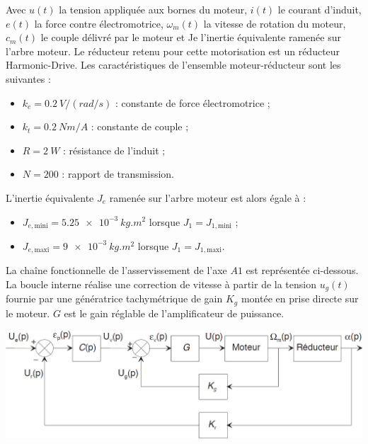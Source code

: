 \documentclass[10pt,fleqn]{article} %
\begin{document}
\begin{multicols}{2}
Avec  $u(t)$  la  tension  appliquée  aux  bornes  du moteur,  $i(t)$  le  courant  d’induit,  $e(t)$  la  force 
contre  électromotrice, $\omega_m(t)$  la  vitesse  de  rotation  du moteur,  $c_m(t)$  le  couple  délivré  par  le 
moteur et Je l’inertie équivalente ramenée sur l’arbre moteur. 
Le  réducteur  retenu  pour  cette  motorisation  est  un  réducteur  Harmonic-Drive.  Les 
caractéristiques de l’ensemble moteur-réducteur sont les suivantes : 
\begin{itemize}
\item $k_e = \SI{0,2}{V/(rad/s)}$ : constante de force électromotrice ; 
\item $k_t = \SI{0,2}{Nm/A}$ : constante de couple ; 
\item $R = \SI{2}{W}$ : résistance de l’induit ; 
\item $N = 200$ : rapport de transmission.
\end{itemize} 

L’inertie équivalente $J_e$ ramenée sur l’arbre moteur est alors égale à : 
\begin{itemize}
\item $J_{e,\text{mini}} = \SI{5,25e-3}{kg.m^2}$ lorsque $J_1=J_{1,\text{mini}}$ ; 
\item $J_{e,\text{maxi}} =\SI{9e-3}{kg.m^2}$ lorsque $J_1=J_{1,\text{maxi}}$.
\end{itemize}

La chaîne fonctionnelle de l’asservissement de l’axe $A1$ est représentée ci-dessous. La boucle interne réalise une correction de vitesse à partir de la tension $u_g(t)$ fournie par une 
génératrice  tachymétrique  de  gain $K_g$ montée  en  prise  directe  sur  le moteur. $G$  est  le  gain 
réglable de l’amplificateur de puissance. 

\begin{center}
\includegraphics[width=\linewidth]{images/fig_02}
\end{center}


\end{multicols}
\end{document}

